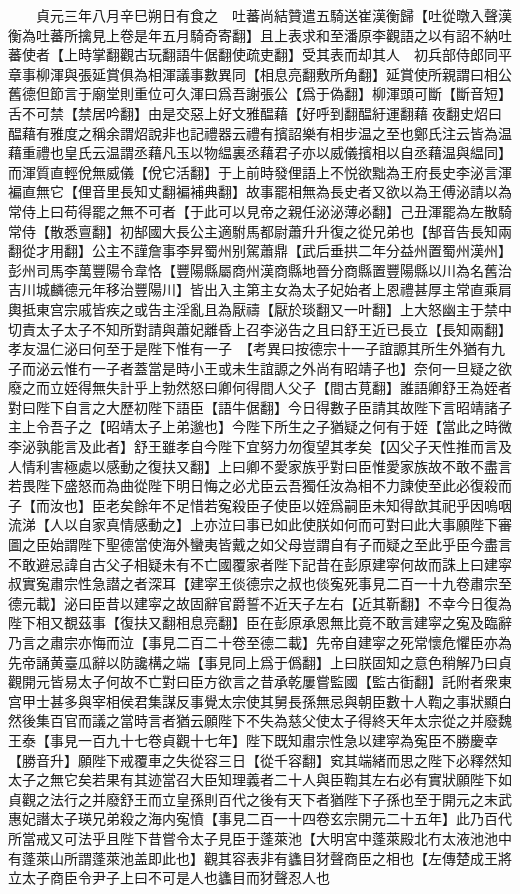 　　貞元三年八月辛巳朔日有食之　吐蕃尚結贊遣五騎送崔漢衡歸【吐從暾入聲漢衡為吐蕃所擒見上卷是年五月騎奇寄翻】且上表求和至潘原李觀語之以有詔不納吐蕃使者【上時掌翻觀古玩翻語牛倨翻使疏吏翻】受其表而却其人　初兵部侍郎同平章事柳渾與張延賞俱為相渾議事數異同【相息亮翻敷所角翻】延賞使所親謂曰相公舊德但節言于廟堂則重位可久渾曰爲吾謝張公【爲于偽翻】柳渾頭可斷【斷音短】舌不可禁【禁居吟翻】由是交惡上好文雅醖藉【好呼到翻醖紆運翻藉夜翻史炤曰醖藉有雅度之稱余謂炤說非也記禮器云禮有擯詔樂有相步温之至也鄭氏注云皆為温藉重禮也皇氏云温謂丞藉凡玉以物緼裏丞藉君子亦以威儀擯相以自丞藉温與緼同】而渾質直輕侻無威儀【侻它活翻】于上前時發俚語上不悦欲黜為王府長史李泌言渾褊直無它【俚音里長知丈翻褊補典翻】故事罷相無為長史者又欲以為王傅泌請以為常侍上曰苟得罷之無不可者【于此可以見帝之親任泌泌薄必翻】己丑渾罷為左散騎常侍【散悉亶翻】初郜國大長公主適駙馬都尉蕭升升復之從兄弟也【郜音告長知兩翻從才用翻】公主不謹詹事李昇蜀州别駕蕭鼎【武后垂拱二年分益州置蜀州漢州】彭州司馬李萬豐陽令韋恪【豐陽縣屬商州漢商縣地晉分商縣置豐陽縣以川為名舊治吉川城麟德元年移治豐陽川】皆出入主第主女為太子妃始者上恩禮甚厚主常直乘肩輿抵東宫宗戚皆疾之或告主淫亂且為厭禱【厭於琰翻又一叶翻】上大怒幽主于禁中切責太子太子不知所對請與蕭妃離昏上召李泌告之且曰舒王近已長立【長知兩翻】孝友温仁泌曰何至于是陛下惟有一子　【考異曰按德宗十一子誼謜其所生外猶有九子而泌云惟冇一子者蓋當是時小王或未生誼謜之外尚有昭靖子也】奈何一旦疑之欲廢之而立姪得無失計乎上勃然怒曰卿何得間人父子【間古莧翻】誰語卿舒王為姪者對曰陛下自言之大歷初陛下語臣【語牛倨翻】今日得數子臣請其故陛下言昭靖諸子主上令吾子之【昭靖太子上弟邈也】今陛下所生之子猶疑之何有于姪【當此之時微李泌孰能言及此者】舒王雖孝自今陛下宜努力勿復望其孝矣【囚父子天性推而言及人情利害極處以感動之復扶又翻】上曰卿不愛家族乎對曰臣惟愛家族故不敢不盡言若畏陛下盛怒而為曲從陛下明日悔之必尤臣云吾獨任汝為相不力諫使至此必復殺而子【而汝也】臣老矣餘年不足惜若寃殺臣子使臣以姪爲嗣臣未知得歆其祀乎因嗚咽流涕【人以自家真情感動之】上亦泣曰事已如此使朕如何而可對曰此大事願陛下審圖之臣始謂陛下聖德當使海外蠻夷皆戴之如父母豈謂自有子而疑之至此乎臣今盡言不敢避忌諱自古父子相疑未有不亡國覆家者陛下記昔在彭原建寜何故而誅上曰建寜叔實寃肅宗性急譛之者深耳【建寜王倓德宗之叔也倓寃死事見二百一十九卷肅宗至德元載】泌曰臣昔以建寜之故固辭官爵誓不近天子左右【近其靳翻】不幸今日復為陛下相又覩茲事【復扶又翻相息亮翻】臣在彭原承恩無比竟不敢言建寜之寃及臨辭乃言之肅宗亦悔而泣【事見二百二十卷至德二載】先帝自建寜之死常懷危懼臣亦為先帝誦黄臺瓜辭以防讒構之端【事見同上爲于僞翻】上曰朕固知之意色稍解乃曰貞觀開元皆易太子何故不亡對曰臣方欲言之昔承乾屢嘗監國【監古衘翻】託附者衆東宫甲士甚多與宰相侯君集謀反事覺太宗使其舅長孫無忌與朝臣數十人鞫之事狀顯白然後集百官而議之當時言者猶云願陛下不失為慈父使太子得終天年太宗從之并廢魏王泰【事見一百九十七卷貞觀十七年】陛下既知肅宗性急以建寜為寃臣不勝慶幸【勝音升】願陛下戒覆車之失從容三日【從千容翻】䆒其端緒而思之陛下必釋然知太子之無它矣若果有其迹當召大臣知理義者二十人與臣鞫其左右必有實狀願陛下如貞觀之法行之并廢舒王而立皇孫則百代之後有天下者猶陛下子孫也至于開元之末武惠妃譖太子瑛兄弟殺之海内寃憤【事見二百一十四卷玄宗開元二十五年】此乃百代所當戒又可法乎且陛下昔嘗令太子見臣于蓬萊池【大明宮中蓬萊殿北冇太液池池中有蓬萊山所謂蓬萊池盖即此也】觀其容表非有蠭目犲聲商臣之相也【左傳楚成王將立太子商臣令尹子上曰不可是人也蠭目而犲聲忍人也